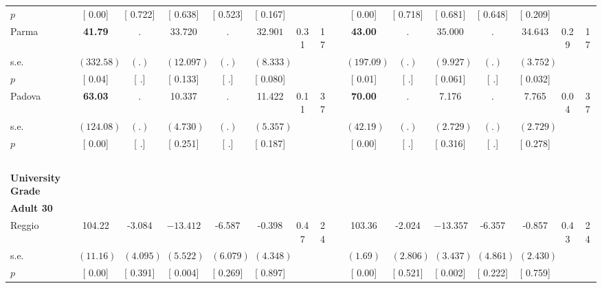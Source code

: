 \begin{longtable}{L{8em} c c c c c c c p{1em} c c c c c c c}
\quad \quad \quad \quad $ p$ & [     0.00] & [    0.722] & [    0.638] & [    0.523] & [    0.167] & & & & [     0.00] & [    0.718] & [    0.681] & [    0.648] & [    0.209] & &  \\[1em]
\quad \quad \quad Parma& \textbf{    41.79} &         . &    33.720 &         . & $ \mathbf{   32.901}$ &      0.31 &        17 & & \textbf{    43.00} &         . & $ \mathbf{   35.000}$ &         . & $ \mathbf{   34.643}$ &      0.29 &        17  \\*
\quad \quad \quad \quad s.e.& $ (   332.58)$ & $ (        .)$ & $ (   12.097)$ & $ (        .)$ & $ (    8.333)$ & & & & $ (   197.09)$ & $ (        .)$ & $ (    9.927)$ & $ (        .)$ & $ (    3.752)$ & &  \\*
\quad \quad \quad \quad $ p$ & [     0.04] & [        .] & [    0.133] & [        .] & [    0.080] & & & & [     0.01] & [        .] & [    0.061] & [        .] & [    0.032] & &  \\[1em]
\quad \quad \quad Padova& \textbf{    63.03} &         . &    10.337 &         . &    11.422 &      0.11 &        37 & & \textbf{    70.00} &         . &     7.176 &         . &     7.765 &      0.04 &        37  \\*
\quad \quad \quad \quad s.e.& $ (   124.08)$ & $ (        .)$ & $ (    4.730)$ & $ (        .)$ & $ (    5.357)$ & & & & $ (    42.19)$ & $ (        .)$ & $ (    2.729)$ & $ (        .)$ & $ (    2.729)$ & &  \\*
\quad \quad \quad \quad $ p$ & [     0.00] & [        .] & [    0.251] & [        .] & [    0.187] & & & & [     0.00] & [        .] & [    0.316] & [        .] & [    0.278] & &  \\[1em]
~\\[1em]
\textbf{University Grade} \\*
\quad \quad \textbf{Adult 30} & & & & & & & & & & & & & & & \\* 
\quad \quad \quad Reggio& 104.22 &    -3.084 & $ \mathbf{  -13.412}$ &    -6.587 &    -0.398 &      0.47 &        24 & & 103.36 &    -2.024 & $ \mathbf{  -13.357}$ &    -6.357 &    -0.857 &      0.43 &        24  \\*
\quad \quad \quad \quad s.e.& $ (    11.16)$ & $ (    4.095)$ & $ (    5.522)$ & $ (    6.079)$ & $ (    4.348)$ & & & & $ (     1.69)$ & $ (    2.806)$ & $ (    3.437)$ & $ (    4.861)$ & $ (    2.430)$ & &  \\*
\quad \quad \quad \quad $ p$ & [     0.00] & [    0.391] & [    0.004] & [    0.269] & [    0.897] & & & & [     0.00] & [    0.521] & [    0.002] & [    0.222] & [    0.759] & &  \\[1em]

\end{longtable}
